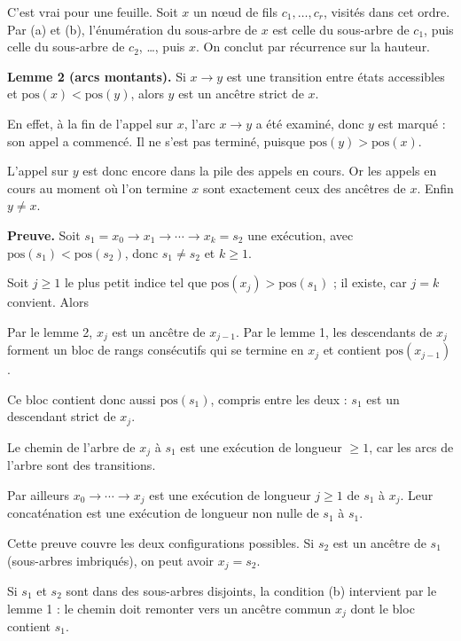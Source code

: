 \documentclass[11pt,a4paper]{article}
\newcommand{\equationajustee}[1]{%
  \sbox{\boiteequation}{$\displaystyle #1$}%
  \ifdim\wd\boiteequation>\linewidth
    \[\resizebox{\linewidth}{!}{\usebox{\boiteequation}}\]%
  \else
    \[#1\]%
  \fi}
\begin{document}
C'est vrai pour une feuille. Soit \(x\) un nœud de fils \(c_1,\dots,c_r\), visités dans cet ordre. Par (a) et (b), l'énumération du sous-arbre de \(x\) est celle du sous-arbre de \(c_1\), puis celle du sous-arbre de \(c_2\), \ldots, puis \(x\). On conclut par récurrence sur la hauteur.

\textbf{Lemme 2 (arcs montants).} Si \(x\to y\) est une transition entre états accessibles et \(\mathrm{pos}(x)<\mathrm{pos}(y)\), alors \(y\) est un ancêtre strict de \(x\).

En effet, à la fin de l'appel sur \(x\), l'arc \(x\to y\) a été examiné, donc \(y\) est marqué : son appel a commencé. Il ne s'est pas terminé, puisque \(\mathrm{pos}(y)>\mathrm{pos}(x)\).

L'appel sur \(y\) est donc encore dans la pile des appels en cours. Or les appels en cours au moment où l'on termine \(x\) sont exactement ceux des ancêtres de \(x\). Enfin \(y\neq x\).

\textbf{Preuve.} Soit \(s_1=x_0\to x_1\to\cdots\to x_k=s_2\) une exécution, avec \(\mathrm{pos}(s_1)<\mathrm{pos}(s_2)\), donc \(s_1\neq s_2\) et \(k\ge1\).

Soit \(j\ge1\) le plus petit indice tel que \(\mathrm{pos}(x_j)>\mathrm{pos}(s_1)\) ; il existe, car \(j=k\) convient. Alors

\equationajustee{\mathrm{pos}(x_{j-1})\le\mathrm{pos}(s_1)<\mathrm{pos}(x_j).}

Par le lemme 2, \(x_j\) est un ancêtre de \(x_{j-1}\). Par le lemme 1, les descendants de \(x_j\) forment un bloc de rangs consécutifs qui se termine en \(x_j\) et contient \(\mathrm{pos}(x_{j-1})\).

Ce bloc contient donc aussi \(\mathrm{pos}(s_1)\), compris entre les deux : \(s_1\) est un descendant strict de \(x_j\).

Le chemin de l'arbre de \(x_j\) à \(s_1\) est une exécution de longueur \(\ge1\), car les arcs de l'arbre sont des transitions.

Par ailleurs \(x_0\to\cdots\to x_j\) est une exécution de longueur \(j\ge1\) de \(s_1\) à \(x_j\). Leur concaténation est une exécution de longueur non nulle de \(s_1\) à \(s_1\).

Cette preuve couvre les deux configurations possibles. Si \(s_2\) est un ancêtre de \(s_1\) (sous-arbres imbriqués), on peut avoir \(x_j=s_2\).

Si \(s_1\) et \(s_2\) sont dans des sous-arbres disjoints, la condition (b) intervient par le lemme 1 : le chemin doit remonter vers un ancêtre commun \(x_j\) dont le bloc contient \(s_1\).
\end{document}
